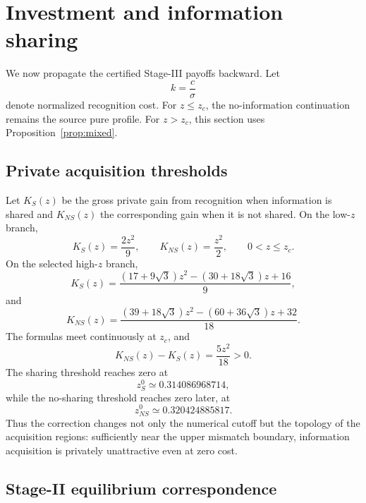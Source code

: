 \section{Investment and information sharing}\label{sec:backward}

We now propagate the certified Stage-III payoffs backward.  Let
\[
k=\frac{c}{\sigma}
\]
denote normalized recognition cost.  For \(z\le z_c\), the no-information continuation remains the source pure profile.  For \(z>z_c\), this section uses Proposition~\ref{prop:mixed}.

\subsection{Private acquisition thresholds}

Let \(K_S(z)\) be the gross private gain from recognition when information is shared and \(K_{NS}(z)\) the corresponding gain when it is not shared.  On the low-\(z\) branch,
\begin{equation}
K_S(z)=\frac{2z^2}{9},
\qquad
K_{NS}(z)=\frac{z^2}{2},
\qquad 0<z\le z_c.
\label{eq:thresholdlow}
\end{equation}
On the selected high-\(z\) branch,
\begin{equation}
K_S(z)=
\frac{(17+9\sqrt3)z^2-(30+18\sqrt3)z+16}{9},
\label{eq:KS}
\end{equation}
and
\begin{equation}
K_{NS}(z)=
\frac{(39+18\sqrt3)z^2-(60+36\sqrt3)z+32}{18}.
\label{eq:KNS}
\end{equation}
The formulas meet continuously at \(z_c\), and
\begin{equation}
K_{NS}(z)-K_S(z)=\frac{5z^2}{18}>0.
\label{eq:thresholdgap}
\end{equation}
The sharing threshold reaches zero at
\[
z_S^0\simeq0.314086968714,
\]
while the no-sharing threshold reaches zero later, at
\[
z_{NS}^0\simeq0.320424885817.
\]
Thus the correction changes not only the numerical cutoff but the topology of the acquisition regions: sufficiently near the upper mismatch boundary, information acquisition is privately unattractive even at zero cost.

\begin{table}[t]
\centering
\caption{Key normalized thresholds and crossings}
\label{tab:thresholds}

\end{table}

\subsection{Stage-II equilibrium correspondence}

